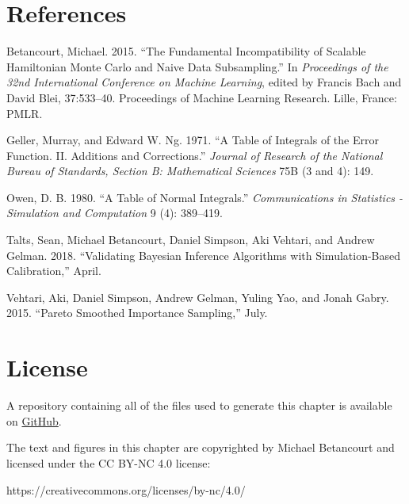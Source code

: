 \documentclass[
  letterpaper,
  DIV=11,
  numbers=noendperiod]{scrartcl}
\newlength{\cslhangindent}
\newenvironment{CSLReferences}[2] %
 {\begin{list}{}{%
  \setlength{\itemindent}{0pt}
  \setlength{\leftmargin}{0pt}
  \setlength{\parsep}{0pt}
  \ifodd #1
   \setlength{\leftmargin}{\cslhangindent}
   \setlength{\itemindent}{-1\cslhangindent}
  \fi
  \setlength{\itemsep}{#2\baselineskip}}}
 {\end{list}}
\begin{document}
\section*{References}\label{references}

\label{refs}
\begin{CSLReferences}{1}{0}
Betancourt, Michael. 2015. {``The Fundamental Incompatibility of
Scalable Hamiltonian Monte Carlo and Naive Data Subsampling.''} In
\emph{Proceedings of the 32nd International Conference on Machine
Learning}, edited by Francis Bach and David Blei, 37:533--40.
Proceedings of Machine Learning Research. Lille, France: PMLR.

Geller, Murray, and Edward W. Ng. 1971. {``A Table of Integrals of the
Error Function. II. Additions and Corrections.''} \emph{Journal of
Research of the National Bureau of Standards, Section B: Mathematical
Sciences} 75B (3 and 4): 149.

Owen, D. B. 1980. {``A Table of Normal Integrals.''}
\emph{Communications in Statistics - Simulation and Computation} 9 (4):
389--419.

Talts, Sean, Michael Betancourt, Daniel Simpson, Aki Vehtari, and Andrew
Gelman. 2018. {``Validating Bayesian Inference Algorithms with
Simulation-Based Calibration,''} April.

Vehtari, Aki, Daniel Simpson, Andrew Gelman, Yuling Yao, and Jonah
Gabry. 2015. {``Pareto Smoothed Importance Sampling,''} July.

\end{CSLReferences}

\section*{License}\label{license}

A repository containing all of the files used to generate this chapter
is available on
\href{https://github.com/betanalpha/quarto_chapters/tree/main/misc/modeling_selection}{GitHub}.

The text and figures in this chapter are copyrighted by Michael
Betancourt and licensed under the CC BY-NC 4.0 license:

https://creativecommons.org/licenses/by-nc/4.0/
\end{document}
